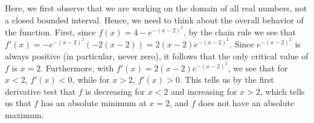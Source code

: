 \begin{activitySolution}
	\item Here, we first observe that we are working on the domain of all real numbers, not a closed bounded interval.  Hence, we need to think about the overall behavior of the function.  First, since $f(x) = 4 - e^{-(x-2)^2}$, by the chain rule we see that $f'(x) = -e^{-(x-2)^2}(-2(x-2)) = 2(x-2)e^{-(x-2)^2}.$  Since $e^{-(x-2)^2}$ is always positive (in particular, never zero), it follows that the only critical value of $f$ is $x = 2$.  Furthermore, with $f'(x) = 2(x-2)e^{-(x-2)^2}$, we see that for $x < 2$, $f'(x) < 0$, while for $x > 2$, $f'(x) > 0$.  This tells us by the first derivative test that $f$ is decreasing for $x < 2$ and increasing for $x > 2$, which tells us that $f$ has an absolute minimum at $x = 2$, and $f$ does not have an absolute maximum.
	\ea
\end{activitySolution}
\aftera